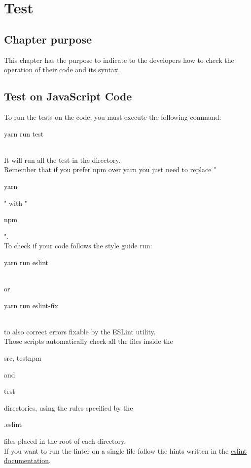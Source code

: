 \documentclass[ManualeSviluppatore]{subfiles}
\begin{document}
\chapter{Test}
\section{Chapter purpose}
This chapter has the purpose to indicate to the developers how to check the operation of their code and its syntax. \\

\section{Test on JavaScript Code}
To run the tests on the code, you must execute the following command: \\
\begin{ttfamily} yarn run test \end{ttfamily} \\
It will run all the test in the  directory. \\
Remember that if you prefer npm over yarn you just need to replace "\begin{ttfamily}yarn\end{ttfamily}" with "\begin{ttfamily}npm\end{ttfamily}". \\
To check if your code follows the style guide run: \\
\begin{ttfamily}yarn run eslint\end{ttfamily} \\
or \\
\begin{ttfamily} yarn run eslint-fix\end{ttfamily} \\
to also correct errors fixable by the ESLint utility. \\
Those scripts automatically check all the files inside the \begin{ttfamily}src, testnpm\end{ttfamily} and \begin{ttfamily}test\end{ttfamily} directories, using the rules specified by the \begin{ttfamily}.eslint\end{ttfamily} files placed in the root of each directory.\\
If you want to run the linter on a single file follow the hints written in the \href{https://eslint.org/docs/user-guide/getting-started}{eslint documentation}.
\end{document}
